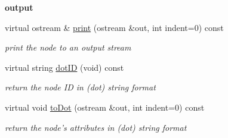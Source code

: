 \begin{Indent}{\bf output}\par
\begin{DoxyCompactItemize}
\item 
virtual ostream \& \hyperlink{classCScope_a550063ff2ce6eaea39066acd84134556}{print} (ostream \&out, int indent=0) const 
\begin{DoxyCompactList}\small\item\em print the node to an output stream \end{DoxyCompactList}\item 
virtual string \hyperlink{classCScope_a7d7064aa88356c64a488a804141d3ef9}{dot\-I\-D} (void) const 
\begin{DoxyCompactList}\small\item\em return the node I\-D in (dot) string format \end{DoxyCompactList}\item 
virtual void \hyperlink{classCScope_a8d4df41fe7af86da25f65e587a9cc93a}{to\-Dot} (ostream \&out, int indent=0) const 
\begin{DoxyCompactList}\small\item\em return the node's attributes in (dot) string format \end{DoxyCompactList}\end{DoxyCompactItemize}
\end{Indent}
